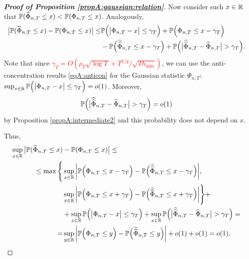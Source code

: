 \begin{proof}[\textnormal{\textbf{Proof of Proposition \ref{propA:gaussian:relation}}}]
Now consider such $x\in \mathbb{R}$ that $\mathbb{P}(\widehat{\Phi}_{n,T}\le x) < \mathbb{P}(\Phi_{n, T}\le x)$. Analogously, 
\begin{align*}
\big| \mathbb{P}(\widehat{\Phi}_{n, T} \le x) - \mathbb{P}(\Phi_{n,T} \le x) \big| \le &\mathbb{P}\Big(\big|\Phi_{n,T} - x \big| \le \gamma_{T}\Big) +\mathbb{P}\Big(\Phi_{n,T} \le x - \gamma_{T}\Big)\\
& -\mathbb{P}\Big(\widehat{\widehat{\Phi}}_{n,T} \le x - \gamma_{T}\Big) +  \mathbb{P} \Big(\big|\widehat{\widehat{\Phi}}_{n,T} - \widehat{\Phi}_{n,T}\big| > \gamma_{T} \Big).  
\end{align*}
Note that since \textcolor{red}{$ \gamma_{T} = O(\rho_T \sqrt{\log T} + T^{1/q}/\sqrt{T h_{\min}})$}, we can use the anti-concentration results \eqref{eqA:anticon} for the Gaussian statistic $\Phi_{n,T}$: $\sup_{x\in \mathbb{R}}\mathbb{P}\Big(\big|\Phi_{n,T} - x \big| \le \gamma_{T}\Big) = o(1)$. Moreover, $$\mathbb{P} \Big(\big|\widehat{\widehat{\Phi}}_{n,T} - \widehat{\Phi}_{n,T}\big| > \gamma_{T} \Big) = o(1)$$ by Proposition \ref{propA:intermediate2} and this probability does not depend on $x$.

Thus, 
\begin{align*}
\sup_{x \in \mathbb{R}} \big| \mathbb{P}(\widehat{\Phi}_{n, T} \le x) &- \mathbb{P}(\Phi_{n,T} \le x) \big| \le \\
\le \max \Bigg\{ &\sup_{x \in \mathbb{R}} \bigg| \mathbb{P}\Big(\Phi_{n,T} \le x - \gamma_{T}\Big) -\mathbb{P}\Big(\widehat{\widehat{\Phi}}_{n,T} \le x - \gamma_{T}\Big)\bigg|, \\
&\sup_{x \in \mathbb{R}} \bigg| \mathbb{P}\Big(\Phi_{n,T} \le x + \gamma_{T}\Big) -\mathbb{P}\Big(\widehat{\widehat{\Phi}}_{n,T} \le x + \gamma_{T}\Big)\bigg| \Bigg\} + \\
&+\sup_{x\in \mathbb{R}}\mathbb{P}\Big(\big|\Phi_{n,T} - x \big| \le \gamma_{T}\Big) + \sup_{x\in\mathbb{R}}\mathbb{P} \Big(\big|\widehat{\widehat{\Phi}}_{n,T} - \widehat{\Phi}_{n,T}\big| > \gamma_{T} \Big) = \\
=&\sup_{y \in \mathbb{R}} \bigg| \mathbb{P}\Big(\Phi_{n,T} \le y\Big) -\mathbb{P}\Big(\widehat{\widehat{\Phi}}_{n,T} \le y\Big)\bigg| + o(1) + o(1) = o(1).
\end{align*}
\end{proof}


